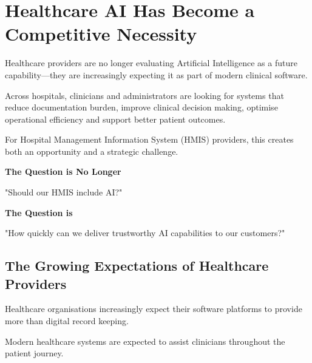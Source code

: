 
\chapter*{Healthcare AI Has Become a Competitive Necessity}

Healthcare providers are no longer evaluating Artificial Intelligence as a future capability—they are increasingly expecting it as part of modern clinical software.

Across hospitals, clinicians and administrators are looking for systems that reduce documentation burden, improve clinical decision making, optimise operational efficiency and support better patient outcomes.

For Hospital Management Information System (HMIS) providers, this creates both an opportunity and a strategic challenge.

\begin{callout}

\textbf{The Question is No Longer}

\vspace{2mm}

\Large

"Should our HMIS include AI?"

\vspace{4mm}

\textbf{The Question is}

\vspace{2mm}

\Large

"How quickly can we deliver trustworthy AI capabilities to our customers?"

\end{callout}


\section{The Growing Expectations of Healthcare Providers}

Healthcare organisations increasingly expect their software platforms to provide more than digital record keeping.

Modern healthcare systems are expected to assist clinicians throughout the patient journey.

\vspace{3mm}

